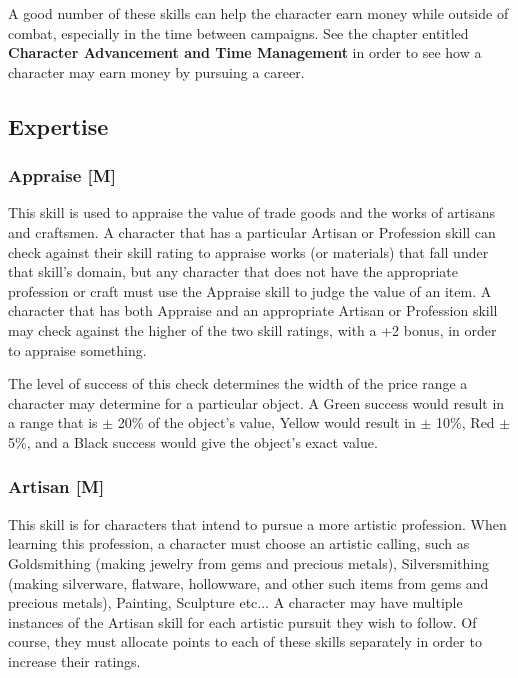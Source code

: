 \documentclass[oneside]{book}
\begin{document}
\begin{multicols}{2}
A good number of these skills can help the character earn money while outside of combat, especially in the time between campaigns. See the chapter entitled \textbf{Character Advancement and Time Management} in order to see how a character may earn money by pursuing a career. 
\subsection{Expertise}
\subsubsection{Appraise [M]}
This skill is used to appraise the value of trade goods and the works of artisans and craftsmen. A character that has a particular Artisan or Profession skill can check against their skill rating to appraise works (or materials) that fall under that skill's domain, but any character that does not have the appropriate profession or craft must use the Appraise skill to judge the value of an item. A character that has both Appraise and an appropriate Artisan or Profession skill may check against the higher of the two skill ratings, with a +2 bonus, in order to appraise something. 

The level of success of this check determines the width of the price range a character may determine for a particular object. A Green success would result in a range that is $\pm$ 20\% of the object's value, Yellow would result in $\pm$ 10\%, Red $\pm$ 5\%, and a Black success would give the object's exact value.
\subsubsection{Artisan [M]}
This skill is for characters that intend to pursue a more artistic profession. When learning this profession, a character must choose an artistic calling, such as Goldsmithing (making jewelry from gems and precious metals), Silversmithing (making silverware, flatware, hollowware, and other such items from gems and precious metals), Painting, Sculpture etc... A character may have multiple instances of the Artisan skill for each artistic pursuit they wish to follow. Of course, they must allocate points to each of these skills separately in order to increase their ratings. 


\end{multicols}
\end{document}
